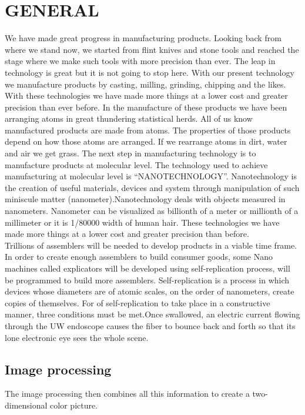 \documentclass{article}
\begin{document}
\section{GENERAL}
We have made great progress in manufacturing products. Looking back from where we stand now, we started from flint knives and stone tools and reached the stage where we make such tools with more precision than ever. The leap in technology is great but it is not going to stop here. With our present technology we manufacture products by casting, milling, grinding, chipping and the likes. With these technologies we have made more things at a lower cost and greater precision than ever before. In the manufacture of these products we have been arranging atoms in great thundering statistical herds. All of us know manufactured products are made from atoms. The properties of those products depend on how those atoms are arranged. If we rearrange atoms in dirt, water and air we get grass. The next step in manufacturing technology is to manufacture products at molecular level. The technology used to achieve manufacturing at molecular
level is “NANOTECHNOLOGY”. Nanotechnology is the creation of useful materials, devices and system through manipulation of such miniscule matter (nanometer).Nanotechnology deals with objects measured in nanometers. Nanometer can be visualized as billionth of a meter or millionth of a millimeter or it is 1/80000 width of human hair. These technologies we have made more things at a lower cost and greater precision than before.
\\Trillions of assemblers will be needed to develop products in a viable time frame. In order to create enough assemblers to build consumer goods, some Nano machines called explicators will be developed using self-replication process, will be programmed to build more assemblers. Self-replication is a process in which devices whose diameters are of atomic scales, on the order of nanometers, create copies of themselves. For of self-replication to take place in a constructive manner, three conditions must be met.Once swallowed, an electric current flowing through the UW endoscope causes the fiber to bounce back and forth so that its lone electronic eye sees the whole scene.

\subsection{Image processing}
The image processing then combines all this information to create a two-dimensional color picture.
\end{document}
